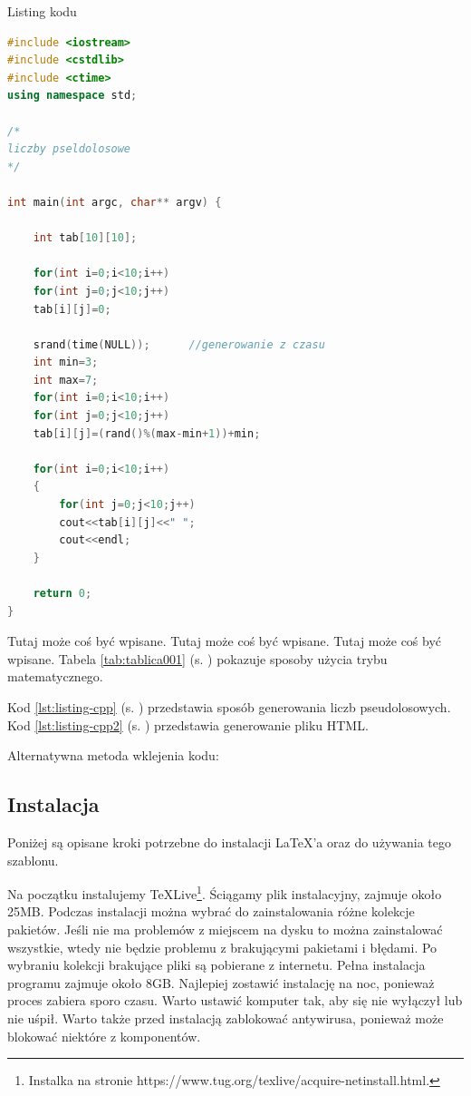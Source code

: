 
Listing kodu

\begin{lstlisting}[caption=Przykładowy kod 001, label={lst:listing-cpp}, language=C++]
#include <iostream>
#include <cstdlib>
#include <ctime>
using namespace std;

/*
liczby pseldolosowe
*/

int main(int argc, char** argv) {
	
	int tab[10][10];
	
	for(int i=0;i<10;i++)
	for(int j=0;j<10;j++)
	tab[i][j]=0;
	
	srand(time(NULL));		//generowanie z czasu
	int min=3;
	int max=7;
	for(int i=0;i<10;i++)
	for(int j=0;j<10;j++)		
	tab[i][j]=(rand()%(max-min+1))+min;	
	
	for(int i=0;i<10;i++)
	{
		for(int j=0;j<10;j++)
		cout<<tab[i][j]<<" ";	
		cout<<endl;
	}
	
	return 0;
}
\end{lstlisting}

Tutaj może coś być wpisane. Tutaj może coś być wpisane. Tutaj może coś być wpisane. Tabela \ref{tab:tablica001} (s. \pageref{tab:tablica001}) pokazuje sposoby użycia trybu matematycznego.

Kod \ref{lst:listing-cpp} (s. \pageref{lst:listing-cpp}) przedstawia sposób generowania liczb pseudolosowych. Kod \ref{lst:listing-cpp2} (s. \pageref{lst:listing-cpp2}) przedstawia generowanie pliku HTML.

Alternatywna metoda wklejenia kodu:




\subsection{Instalacja}  %

\hspace{0.60cm}Poniżej są opisane kroki potrzebne do instalacji \LaTeX 'a oraz do używania tego szablonu.

 Na początku instalujemy \TeX{}Live\footnote{Instalka na stronie  https://www.tug.org/texlive/acquire-netinstall.html\cite{www2}.}. Ściągamy plik instalacyjny, zajmuje około 25MB. Podczas instalacji można wybrać do zainstalowania różne kolekcje pakietów. Jeśli nie ma problemów z miejscem na dysku to można zainstalować wszystkie, wtedy nie będzie problemu z brakującymi pakietami i błędami. Po wybraniu kolekcji brakujące pliki są pobierane z internetu. Pełna instalacja programu zajmuje około 8GB. Najlepiej zostawić instalację na noc, ponieważ proces zabiera sporo czasu. Warto ustawić komputer tak, aby się nie wyłączył lub nie uśpił. Warto także przed instalacją zablokować antywirusa, ponieważ może blokować niektóre z komponentów.
 

